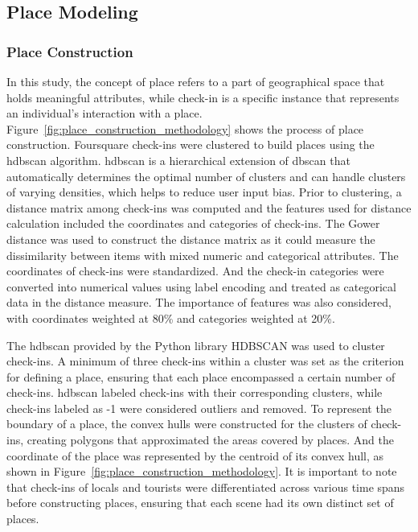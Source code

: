 \documentclass{article}
\theoremstyle{remark}
\begin{document}
\subsection{Place Modeling} \label{place_modeling}

\subsubsection{Place Construction} \label{place_construction}

In this study, the concept of place refers to a part of geographical space that holds meaningful attributes, while check-in is a specific instance that represents an individual's interaction with a place. Figure~\ref{fig:place_construction_methodology} shows the process of place construction. Foursquare check-ins were clustered to build places using the \acrfull{hdbscan} \citep{campello_density-based_2013} algorithm. \acrshort{hdbscan} is a hierarchical extension of \acrshort{dbscan} that automatically determines the optimal number of clusters and can handle clusters of varying densities, which helps to reduce user input bias. Prior to clustering, a distance matrix among check-ins was computed and the features used for distance calculation included the coordinates and categories of check-ins. The Gower distance \citep{gower_general_1971} was used to construct the distance matrix as it could measure the dissimilarity between items with mixed numeric and categorical attributes. The coordinates of check-ins were standardized. And the check-in categories were converted into numerical values using label encoding and treated as categorical data in the distance measure. The importance of features was also considered, with coordinates weighted at 80\% and categories weighted at 20\%.

The hdbscan provided by the Python library HDBSCAN \citep{mcinnes_hdbscan_2017} was used to cluster check-ins. A minimum of three check-ins within a cluster was set as the criterion for defining a place, ensuring that each place encompassed a certain number of check-ins. \acrshort{hdbscan} labeled check-ins with their corresponding clusters, while check-ins labeled as -1 were considered outliers and removed. To represent the boundary of a place, the convex hulls were constructed for the clusters of check-ins, creating polygons that approximated the areas covered by places. And the coordinate of the place was represented by the centroid of its convex hull, as shown in Figure~\ref{fig:place_construction_methodology}. It is important to note that check-ins of locals and tourists were differentiated across various time spans before constructing places, ensuring that each scene had its own distinct set of places.
\end{document}
